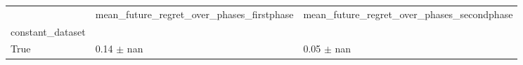 \begin{tabular}{lll}
\toprule
 & mean_future_regret_over_phases_firstphase & mean_future_regret_over_phases_secondphase \\
constant_dataset &  &  \\
\midrule
True & 0.14 $\pm$ nan & 0.05 $\pm$ nan \\
\bottomrule
\end{tabular}
